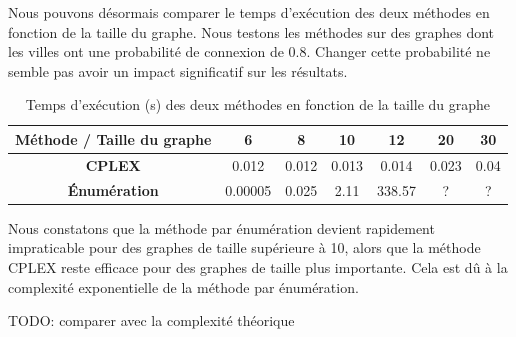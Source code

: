 Nous pouvons désormais comparer le temps d'exécution des deux méthodes en fonction de la taille du graphe. Nous testons les méthodes sur des graphes dont les villes ont une probabilité de connexion de 0.8. Changer cette probabilité ne semble pas avoir un impact significatif sur les résultats.

\begin{table}[H]
    \centering
    \begin{tabular}{|c|c|c|c|c|c|c|}
        \hline
        \textbf{Méthode / Taille du graphe} & 6 & 8 & 10 & 12 & 20 & 30 \\
        \hline
        \textbf{CPLEX} & 0.012 & 0.012 & 0.013 & 0.014 & 0.023 & 0.04 \\
        \hline
        \textbf{Énumération} & 0.00005 & 0.025 & 2.11 & 338.57 & ? & ? \\
        \hline
    \end{tabular}
    \caption{Temps d'exécution (s) des deux méthodes en fonction de la taille du graphe}
\end{table}

Nous constatons que la méthode par énumération devient rapidement impraticable pour des graphes de taille supérieure à 10, alors que la méthode CPLEX reste efficace pour des graphes de taille plus importante. Cela est dû à la complexité exponentielle de la méthode par énumération.

 TODO: comparer avec la complexité théorique